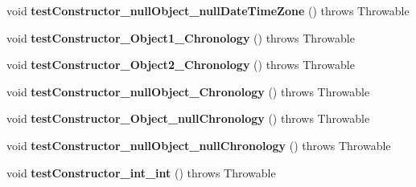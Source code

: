 \begin{DoxyCompactItemize}
\item 
\hypertarget{classorg_1_1joda_1_1time_1_1_test_local_time___constructors_ae7fa8ec3d218c875b0ad5e687eae2c1b}{void {\bfseries test\-Constructor\-\_\-null\-Object\-\_\-null\-Date\-Time\-Zone} ()  throws Throwable }\label{classorg_1_1joda_1_1time_1_1_test_local_time___constructors_ae7fa8ec3d218c875b0ad5e687eae2c1b}

\item 
\hypertarget{classorg_1_1joda_1_1time_1_1_test_local_time___constructors_a3ab88aff9ce3c91a34f2ec280613831c}{void {\bfseries test\-Constructor\-\_\-\-Object1\-\_\-\-Chronology} ()  throws Throwable }\label{classorg_1_1joda_1_1time_1_1_test_local_time___constructors_a3ab88aff9ce3c91a34f2ec280613831c}

\item 
\hypertarget{classorg_1_1joda_1_1time_1_1_test_local_time___constructors_a455965a71a51250ba0cb96748b1c2bbf}{void {\bfseries test\-Constructor\-\_\-\-Object2\-\_\-\-Chronology} ()  throws Throwable }\label{classorg_1_1joda_1_1time_1_1_test_local_time___constructors_a455965a71a51250ba0cb96748b1c2bbf}

\item 
\hypertarget{classorg_1_1joda_1_1time_1_1_test_local_time___constructors_af96fca97b35ddc7025dac5d1e438f069}{void {\bfseries test\-Constructor\-\_\-null\-Object\-\_\-\-Chronology} ()  throws Throwable }\label{classorg_1_1joda_1_1time_1_1_test_local_time___constructors_af96fca97b35ddc7025dac5d1e438f069}

\item 
\hypertarget{classorg_1_1joda_1_1time_1_1_test_local_time___constructors_a72747a572bae7f1b544449bcb5430448}{void {\bfseries test\-Constructor\-\_\-\-Object\-\_\-null\-Chronology} ()  throws Throwable }\label{classorg_1_1joda_1_1time_1_1_test_local_time___constructors_a72747a572bae7f1b544449bcb5430448}

\item 
\hypertarget{classorg_1_1joda_1_1time_1_1_test_local_time___constructors_a4a546693f07b6f180894d0bfe7989ced}{void {\bfseries test\-Constructor\-\_\-null\-Object\-\_\-null\-Chronology} ()  throws Throwable }\label{classorg_1_1joda_1_1time_1_1_test_local_time___constructors_a4a546693f07b6f180894d0bfe7989ced}

\item 
\hypertarget{classorg_1_1joda_1_1time_1_1_test_local_time___constructors_a3c7aae421c6bea890fd2a51a67994973}{void {\bfseries test\-Constructor\-\_\-int\-\_\-int} ()  throws Throwable }\label{classorg_1_1joda_1_1time_1_1_test_local_time___constructors_a3c7aae421c6bea890fd2a51a67994973}


\end{DoxyCompactItemize}
